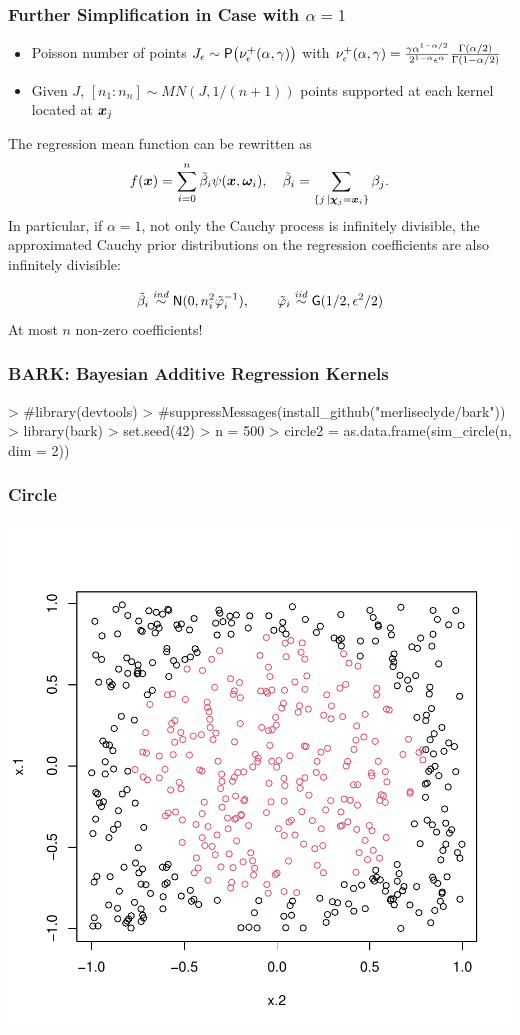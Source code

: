 \documentclass[]{beamer}
\newcommand{\bs}[2]{\begin{frame} \frametitle{#1}
{#2}
\end{frame} }
\begin{document}
\bs{Further Simplification in Case with $\alpha = 1$} {
  \begin{itemize}
  \item Poisson number of points $J_\epsilon\sim \mbox{\sf P}\big(
    \nu_\epsilon^+(\alpha, \gamma) \big)$ with $\nu_\epsilon^+(\alpha, \gamma)
  = \frac{\gamma \alpha^{1-\alpha/2}}{2^{1 - \alpha}\epsilon^\alpha}
  \frac{\Gamma(\alpha/2)}{\Gamma(1-\alpha/2)}$ \pause
  \item Given $J$, $[ n_1 : n_n] \sim  MN(J, 1/(n+1))$ points
    supported at each kernel located at $\bm x_j$  \pause
  \end{itemize}
The regression mean function can be rewritten as
\[
  f(\bm x) = \sum_{i=0}^n \tilde{\beta}_i \psi(\bm x, \bm \omega_i), \quad
  \tilde{\beta}_i = \sum_{\{j \, \mid \bm \chi_j = \bm x_i\}} \beta_j.
\]
\pause
In particular, if $\alpha = 1$, not only the Cauchy process is infinitely
divisible, the approximated Cauchy prior distributions on the regression
coefficients are also infinitely divisible:

$$
  \tilde{\beta}_i  \mathrel{\mathop{\sim}\limits^{\mathit{ind}}}
  \textsf{N}(0, n_i^2 \tilde{\varphi}_i^{-1}), \qquad
  \tilde{\varphi}_i \mathrel{\mathop{\sim}\limits^{\mathit{iid}}} \mbox{\sf G}( 1/2, \epsilon^2/2)
$$
\pause
At most $n$ non-zero coefficients!
}

\begin{frame}[fragile] \frametitle{BARK: Bayesian Additive Regression Kernels }
\begin{Schunk}
\begin{Sinput}
> #library(devtools)
> #suppressMessages(install_github("merliseclyde/bark"))
> library(bark)
> set.seed(42)
> n = 500
> circle2 = as.data.frame(sim_circle(n, dim = 2))
\end{Sinput}
\end{Schunk}

\end{frame}

\begin{frame}[fragile] \frametitle{Circle}
\includegraphics{svm-r}

\end{frame}
\end{document}
